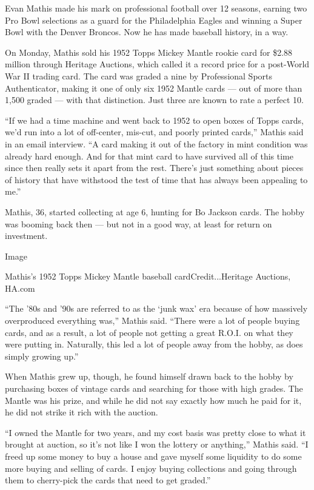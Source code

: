 Evan Mathis made his mark on professional football over 12 seasons,
earning two Pro Bowl selections as a guard for the Philadelphia Eagles
and winning a Super Bowl with the Denver Broncos. Now he has made
baseball history, in a way.

On Monday, Mathis sold his 1952 Topps Mickey Mantle rookie card for
\$2.88 million through Heritage Auctions, which called it a record price
for a post-World War II trading card. The card was graded a nine by
Professional Sports Authenticator, making it one of only six 1952 Mantle
cards --- out of more than 1,500 graded --- with that distinction. Just
three are known to rate a perfect 10.

``If we had a time machine and went back to 1952 to open boxes of Topps
cards, we'd run into a lot of off-center, mis-cut, and poorly printed
cards,'' Mathis said in an email interview. ``A card making it out of
the factory in mint condition was already hard enough. And for that mint
card to have survived all of this time since then really sets it apart
from the rest. There's just something about pieces of history that have
withstood the test of time that has always been appealing to me.''

Mathis, 36, started collecting at age 6, hunting for Bo Jackson cards.
The hobby was booming back then --- but not in a good way, at least for
return on investment.

Image

Mathis's 1952 Topps Mickey Mantle baseball cardCredit...Heritage
Auctions, HA.com

``The '80s and '90s are referred to as the `junk wax' era because of how
massively overproduced everything was,'' Mathis said. ``There were a lot
of people buying cards, and as a result, a lot of people not getting a
great R.O.I. on what they were putting in. Naturally, this led a lot of
people away from the hobby, as does simply growing up.''

When Mathis grew up, though, he found himself drawn back to the hobby by
purchasing boxes of vintage cards and searching for those with high
grades. The Mantle was his prize, and while he did not say exactly how
much he paid for it, he did not strike it rich with the auction.

``I owned the Mantle for two years, and my cost basis was pretty close
to what it brought at auction, so it's not like I won the lottery or
anything,'' Mathis said. ``I freed up some money to buy a house and gave
myself some liquidity to do some more buying and selling of cards. I
enjoy buying collections and going through them to cherry-pick the cards
that need to get graded.''

